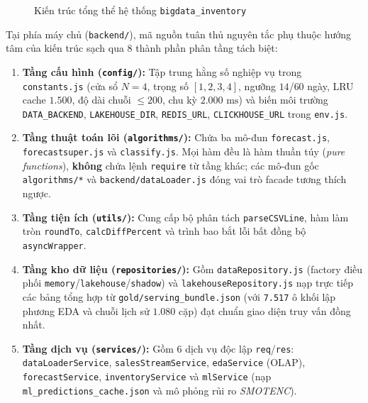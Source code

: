 \begin{figure}[H]
	\centering
	\caption{Kiến trúc tổng thể hệ thống \texttt{bigdata\_inventory}}
	\label{fig:system_architecture}
\end{figure}

Tại phía máy chủ (\texttt{backend/}), mã nguồn tuân thủ nguyên tắc phụ thuộc hướng tâm của kiến trúc sạch qua $8$ thành phần phân tầng tách biệt:
\begin{enumerate}[label=\textit{\arabic*},topsep=0pt, itemsep=1pt]
	\item \textbf{Tầng cấu hình (\texttt{config/}):} Tập trung hằng số nghiệp vụ trong \texttt{constants.js} (cửa sổ $N=4$, trọng số $[1, 2, 3, 4]$, ngưỡng $14$/$60$ ngày, LRU cache $1.500$, độ dài chuỗi $\le 200$, chu kỳ $2.000\text{ ms}$) và biến môi trường \texttt{DATA_BACKEND}, \texttt{LAKEHOUSE_DIR}, \texttt{REDIS_URL}, \texttt{CLICKHOUSE_URL} trong \texttt{env.js}.
	\item \textbf{Tầng thuật toán lõi (\texttt{algorithms/}):} Chứa ba mô-đun \texttt{forecast.js}, \texttt{forecastsuper.js} và \texttt{classify.js}. Mọi hàm đều là hàm thuần túy (\textit{pure functions}), \textbf{không} chứa lệnh \texttt{require} từ tầng khác; các mô-đun gốc \texttt{algorithms/*} và \texttt{backend/dataLoader.js} đóng vai trò facade tương thích ngược.
	\item \textbf{Tầng tiện ích (\texttt{utils/}):} Cung cấp bộ phân tách \texttt{parseCSVLine}, hàm làm tròn \texttt{roundTo}, \texttt{calcDiffPercent} và trình bao bắt lỗi bất đồng bộ \texttt{asyncWrapper}.
	\item \textbf{Tầng kho dữ liệu (\texttt{repositories/}):} Gồm \texttt{dataRepository.js} (factory điều phối \texttt{memory}/\texttt{lakehouse}/\texttt{shadow}) và \texttt{lakehouseRepository.js} nạp trực tiếp các bảng tổng hợp từ \texttt{gold/serving_bundle.json} (với \texttt{7.517} ô khối lập phương EDA và chuỗi lịch sử $1.080$ cặp) đạt chuẩn giao diện truy vấn đồng nhất.
	\item \textbf{Tầng dịch vụ (\texttt{services/}):} Gồm $6$ dịch vụ độc lập \texttt{req}/\texttt{res}: \texttt{dataLoaderService}, \texttt{salesStreamService}, \texttt{edaService} (OLAP), \texttt{forecastService}, \texttt{inventoryService} và \texttt{mlService} (nạp \texttt{ml\_\allowbreak{}predictions\_\allowbreak{}cache.json} và mô phỏng rủi ro \textit{SMOTENC}).

\end{enumerate}
